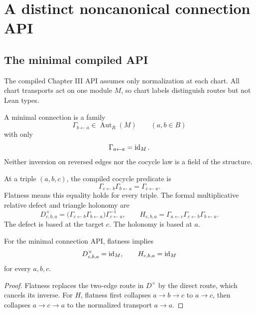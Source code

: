 \section{A distinct noncanonical connection API}
\label{sec:connection}

\subsection{The minimal compiled API}

The compiled Chapter III API assumes only normalization at each chart.  All
chart transports act on one module $M$, so chart labels distinguish routes
but not Lean types.

\begin{definition}
\label{def:minimal-connection}
A minimal connection is a family
\[
\Gamma_{b\leftarrow a}\in\operatorname{Aut}_R(M)
\qquad(a,b\in B)
\]
with only
\[
\Gamma_{a\leftarrow a}=\operatorname{id}_M.
\]
Neither inversion on reversed edges nor the cocycle law is a field of the
structure.
\end{definition}

At a triple $(a,b,c)$, the compiled cocycle predicate is
\[
\Gamma_{c\leftarrow b}\Gamma_{b\leftarrow a}
=\Gamma_{c\leftarrow a}.
\]
Flatness means this equality holds for every triple.  The formal
multiplicative relative defect and triangle holonomy are
\[
D^\times_{c,b,a}
=
\bigl(\Gamma_{c\leftarrow b}\Gamma_{b\leftarrow a}\bigr)
\Gamma_{c\leftarrow a}^{-1},
\qquad
H_{c,b,a}
=
\Gamma_{a\leftarrow c}
\Gamma_{c\leftarrow b}
\Gamma_{b\leftarrow a}.
\]
The defect is based at the target $c$.  The holonomy is based at $a$.

\begin{theorem}
\label{thm:minimal-flatness}
For the minimal connection API, flatness implies
\[
D^\times_{c,b,a}=\operatorname{id}_M,
\qquad
H_{c,b,a}=\operatorname{id}_M
\]
for every $a,b,c$.
\end{theorem}

\begin{proof}
Flatness replaces the two-edge route in $D^\times$ by the direct route,
which cancels its inverse.  For $H$, flatness first collapses $a\to b\to c$
to $a\to c$, then collapses $a\to c\to a$ to the normalized transport
$a\to a$.
\end{proof}


